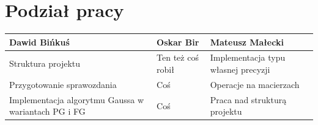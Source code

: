\documentclass[10pt]{article}
\begin{document}
\section{Podział pracy}
\centering
	\begin{tabular}{| l | l | l |}
		\hline
		\textbf{Dawid Bińkuś} & \textbf{Oskar Bir} & \textbf{Mateusz Małecki} \\ \hline
		Struktura projektu & Ten też coś robił & Implementacja typu własnej precyzji \\ \hline
		Przygotowanie sprawozdania & Coś & Operacje na macierzach\\ \hline
		Implementacja algorytmu Gaussa w wariantach PG i FG & Coś & Praca nad strukturą projektu \\ \hline
		
		
	\end{tabular}
\end{document}
